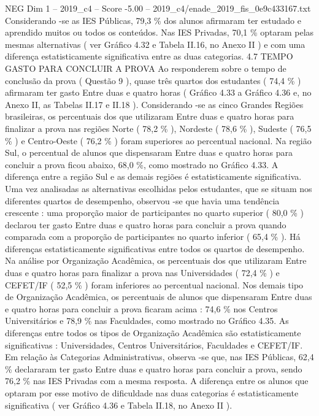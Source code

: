 \begin{textsample}{NEG Dim 1 – 2019\_c4 – Score -5.00 – 2019\_c4/enade\_2019\_fis\_0e9c433167.txt}
Considerando -se as IES Públicas, 79,3 \% dos alunos afirmaram ter estudado e aprendido muitos ou todos os conteúdos.
Nas IES Privadas, 70,1 \% optaram pelas mesmas alternativas ( ver Gráfico 4.32 e Tabela II.16, no Anexo II ) e com uma diferença estatisticamente significativa entre as duas categorias. 4.7 TEMPO GASTO PARA CONCLUIR A PROVA Ao responderem sobre o tempo de conclusão da prova ( Questão 9 ), quase três quartos dos estudantes ( 74,4 \% ) afirmaram ter gasto Entre duas e quatro horas ( Gráfico 4.33 a Gráfico 4.36 e, no Anexo II, as Tabelas II.17 e II.18 ).
Considerando -se as cinco Grandes Regiões brasileiras, os percentuais dos que utilizaram Entre duas e quatro horas para finalizar a prova nas regiões Norte ( 78,2 \% ), Nordeste ( 78,6 \% ), Sudeste ( 76,5 \% ) e Centro-Oeste ( 76,2 \% ) foram superiores ao percentual nacional.
Na região Sul, o percentual de alunos que dispensaram Entre duas e quatro horas para concluir a prova ficou abaixo, 68,0 \%, como mostrado no Gráfico 4.33.
A diferença entre a região Sul e as demais regiões é estatisticamente significativa.
Uma vez analisadas as alternativas escolhidas pelos estudantes, que se situam nos diferentes quartos de desempenho, observou -se que havia uma tendência crescente : uma proporção maior de participantes no quarto superior ( 80,0 \% ) declarou ter gasto Entre duas e quatro horas para concluir a prova quando comparada com a proporção de participantes no quarto inferior ( 65,4 \% ).
Há diferenças estatisticamente significativas entre todos os quartos de desempenho.
Na análise por Organização Acadêmica, os percentuais dos que utilizaram Entre duas e quatro horas para finalizar a prova nas Universidades ( 72,4 \% ) e CEFET/IF ( 52,5 \% ) foram inferiores ao percentual nacional.
Nos demais tipo de Organização Acadêmica, os percentuais de alunos que dispensaram Entre duas e quatro horas para concluir a prova ficaram acima : 74,6 \% nos Centros Universitários e 78,9 \% nas Faculdades, como mostrado no Gráfico 4.35.
As diferenças entre todos os tipos de Organização Acadêmica são estatisticamente significativas : Universidades, Centros Universitários, Faculdades e CEFET/IF.
Em relação às Categorias Administrativas, observa -se que, nas IES Públicas, 62,4 \% declararam ter gasto Entre duas e quatro horas para concluir a prova, sendo 76,2 \% nas IES Privadas com a mesma resposta.
A diferença entre os alunos que optaram por esse motivo de dificuldade nas duas categorias é estatisticamente significativa ( ver Gráfico 4.36 e Tabela II.18, no Anexo II ).

\end{textsample}
